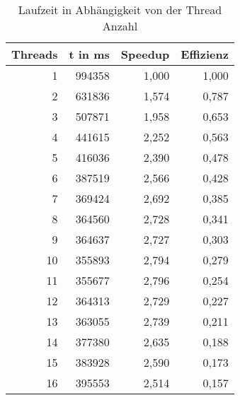 \begin{table}[htbp]
  \centering
  \caption{Laufzeit in Abh\"angigkeit von der Thread Anzahl}
    \begin{tabular}{rrrr}
    \toprule
    \multicolumn{1}{c}{Threads} & \multicolumn{1}{c}{t in ms} & \multicolumn{1}{l}{Speedup} & \multicolumn{1}{l}{Effizienz} \\
    \midrule
    1     & 994358 & 1,000 & 1,000 \\
    \midrule
    2     & 631836 & 1,574 & 0,787 \\
    \midrule
    3     & 507871 & 1,958 & 0,653 \\
    \midrule
    4     & 441615 & 2,252 & 0,563 \\
    \midrule
    5     & 416036 & 2,390 & 0,478 \\
    \midrule
    6     & 387519 & 2,566 & 0,428 \\
    \midrule
    7     & 369424 & 2,692 & 0,385 \\
    \midrule
    8     & 364560 & 2,728 & 0,341 \\
    \midrule
    9     & 364637 & 2,727 & 0,303 \\
    \midrule
    10    & 355893 & 2,794 & 0,279 \\
    \midrule
    11    & 355677 & 2,796 & 0,254 \\
    \midrule
    12    & 364313 & 2,729 & 0,227 \\
    \midrule
    13    & 363055 & 2,739 & 0,211 \\
    \midrule
    14    & 377380 & 2,635 & 0,188 \\
    \midrule
    15    & 383928 & 2,590 & 0,173 \\
    \midrule
    16    & 395553 & 2,514 & 0,157 \\
    \bottomrule
    \end{tabular}%
  \label{tab:Base64Laufzeit}%
\end{table}%

